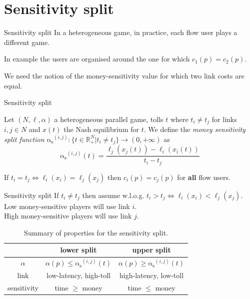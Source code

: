 \documentclass{beamer}
\newcommand{\as}{\mathrm{\alpha_s}}
\newcommand{\R}{\mathbb{R}}
\begin{document}
\section{Sensitivity split}

\begin{frame}{Sensitivity split}
	In a heterogeneous game, in practice, each flow user plays a different game.

	In example the users are organised around the one for which $c_1(p) = c_2(p)$.

	We need the notion of the money-sensitivity value for which two link costs are equal.
\end{frame}

\begin{frame}{Sensitivity split}
	\begin{definition}
		Let $(N, \ell, \alpha)$ a heterogeneous parallel game, tolls $t$ where $t_i \ne t_j$ for links $i, j \in N$ and $x(t)$ the Nash equilibrium for $t$.
		We define the \textit{money sensitivity split function} $\as^{(i, j)}: \{t \in \R_+^N|t_i \ne t_j\} \rightarrow (0, +\infty)$ as
		\[\as^{(i, j)}(t) = \frac{\ell_j(x_j(t)) - \ell_i(x_i(t))}{t_i - t_j}\]
	\end{definition}
	If $t_i = t_j \Leftrightarrow \ell_i(x_i) = \ell_j(x_j)$ then $c_i(p) = c_j(p)$ for \textbf{all} flow users.
\end{frame}

\begin{frame}{Sensitivity split}
	If $t_i \ne t_j$ then assume w.l.o.g. $t_i > t_j \Leftrightarrow \ell_i(x_i) < \ell_j(x_j)$.\\
	Low money-sensitive players will use link $i$.\\
	High money-sensitive players will use link $j$.

	\begin{table}[h!]
		\centering
		\caption{Summary of properties for the sensitivity split.}
		\begin{tabular}{| c || c | c |}
			\hline
			& \textbf{lower split} & \textbf{upper split} \\ \hline
			$\alpha$ & $\alpha(p) \le \as^{(i, j)}(t)$ & $\alpha(p) \ge \as^{(i, j)}(t)$ \\ \hline
			link & low-latency, high-toll & high-latency, low-toll \\ \hline
			sensitivity & time $\ge$ money & time $\le$ money \\ \hline
		\end{tabular}
		\label{table:split_summary}
	\end{table}
\end{frame}
\end{document}

